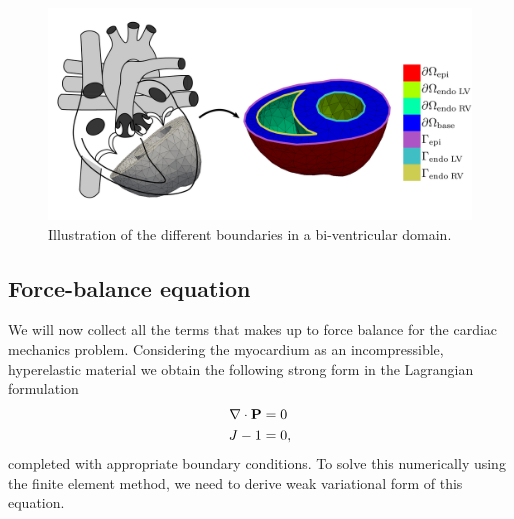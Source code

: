 \begin{figure}[htbp]
  \centering
    \includegraphics[width=\textwidth]{chapters/introduction/figures/boundaries}
\caption{Illustration of the different boundaries in a bi-ventricular
  domain.}
\label{fig:boundaries}
\end{figure}


\subsection{Force-balance equation}
We will now collect all the terms that makes up to force balance for
the cardiac mechanics problem. Considering the myocardium as an incompressible,
hyperelastic material we obtain the following strong form in the
Lagrangian formulation 
\begin{align}
  \begin{split}
  \nabla \cdot \mathbf{P} &= 0 \\
  J - 1 &= 0,
  \end{split}
 \label{eq:force_balance_strong}
\end{align}
completed with appropriate boundary conditions. To solve this
numerically using the finite element method, we need to derive weak
variational form of this equation.
 


